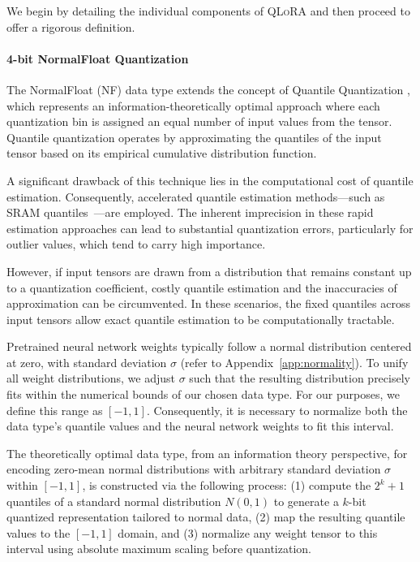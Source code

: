 We begin by detailing the individual components of \textsc{QLoRA} and then proceed to offer a rigorous definition.

\paragraph{4-bit NormalFloat Quantization} The NormalFloat (NF) data type extends the concept of Quantile Quantization \citep{dettmers2022optimizers}, which represents an information-theoretically optimal approach where each quantization bin is assigned an equal number of input values from the tensor. Quantile quantization operates by approximating the quantiles of the input tensor based on its empirical cumulative distribution function.

A significant drawback of this technique lies in the computational cost of quantile estimation. Consequently, accelerated quantile estimation methods—such as SRAM quantiles~\citep{dettmers2022optimizers}—are employed. The inherent imprecision in these rapid estimation approaches can lead to substantial quantization errors, particularly for outlier values, which tend to carry high importance.

However, if input tensors are drawn from a distribution that remains constant up to a quantization coefficient, costly quantile estimation and the inaccuracies of approximation can be circumvented. In these scenarios, the fixed quantiles across input tensors allow exact quantile estimation to be computationally tractable.

Pretrained neural network weights typically follow a normal distribution centered at zero, with standard deviation $\sigma$ (refer to Appendix~\ref{app:normality}). To unify all weight distributions, we adjust $\sigma$ such that the resulting distribution precisely fits within the numerical bounds of our chosen data type. For our purposes, we define this range as $[-1, 1]$. Consequently, it is necessary to normalize both the data type's quantile values and the neural network weights to fit this interval.

The theoretically optimal data type, from an information theory perspective, for encoding zero-mean normal distributions with arbitrary standard deviation $\sigma$ within $[-1, 1]$, is constructed via the following process: (1) compute the $2^k+1$ quantiles of a standard normal distribution $N(0, 1)$ to generate a $k$-bit quantized representation tailored to normal data, (2) map the resulting quantile values to the $[-1, 1]$ domain, and (3) normalize any weight tensor to this interval using absolute maximum scaling before quantization.

